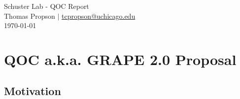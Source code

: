 \documentclass[letterpaper, 12pt]{article}
\begin{document}
\begin{center}
  {\huge Schuster Lab - QOC Report} \\[0.5em]
  {\large Thomas Propson $\vert$ \href{mailto:tcpropson@uchicago.edu}
    {tcpropson@uchicago.edu} \\[0.5em] \today}
\end{center}

\section{QOC a.k.a. GRAPE 2.0 Proposal}

\subsection{Motivation}
\end{document}
